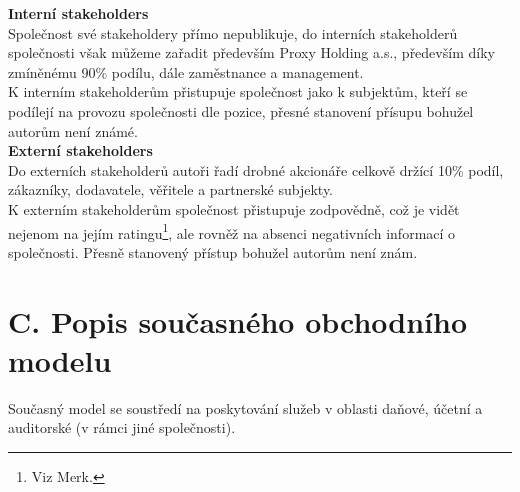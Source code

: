 \textbf{Interní stakeholders}\\


Společnost své stakeholdery přímo nepublikuje, do interních stakeholderů společnosti však můžeme zařadit především Proxy Holding a.s., především díky zmíněnému 90\% podílu, dále zaměstnance a management.\\

K interním stakeholderům přistupuje společnost jako k subjektům, kteří se podílejí na provozu společnosti dle pozice, přesné stanovení přísupu bohužel autorům není známé.\\

\textbf{Externí stakeholders}\\


Do externích stakeholderů autoři řadí drobné akcionáře celkově držící 10\% podíl, zákazníky, dodavatele, věřitele a partnerské subjekty.\\

K externím stakeholderům společnost přistupuje zodpovědně, což je vidět nejenom na jejím ratingu\footnote{Viz Merk.}, ale rovněž na absenci negativních informací o společnosti. Přesně stanovený přístup bohužel autorům není znám.\\



\section*{C. Popis současného obchodního modelu}
\label{sec:Popis soucasneho obchodniho modelu}

Současný model se soustředí na poskytování služeb v oblasti daňové, účetní a auditorské (v rámci jiné společnosti).\\

